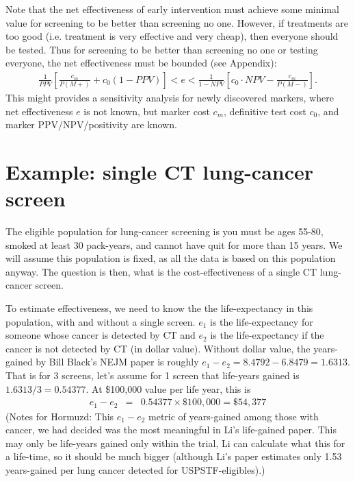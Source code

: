 \documentclass[11pt]{article}
\begin{document}
Note that the net effectiveness of early intervention must achieve some minimal value for screening to be better than screening no one.  However, if treatments are too good (i.e. treatment is very effective and very cheap), then everyone should be tested. Thus for screening to be better than screening no one or testing everyone, the net effectiveness must be bounded (see Appendix):
\begin{eqnarray*}
  \frac{1}{PPV}\left[\frac{c_m}{P(M+)}+c_0(1-PPV)\right] < e < \frac{1}{1-NPV}\left[c_0\cdot NPV - \frac{c_m}{P(M-)}\right]. 
\end{eqnarray*}
This might provides a sensitivity analysis for newly discovered markers, where net effectiveness $e$ is not known, but marker cost $c_m$, definitive test cost $c_0$, and marker PPV/NPV/positivity are known.  


\section{Example: single CT lung-cancer screen}

The eligible population for lung-cancer screening is you must be ages 55-80, smoked at least 30 pack-years, and cannot have quit for more than 15 years.  We will assume this population is fixed, as all the data is based on this population anyway.  The question is then, what is the cost-effectiveness of a single CT lung-cancer screen.

To estimate effectiveness, we need to know the the life-expectancy in this population, with and without a single screen.  $e_1$ is the life-expectancy for someone whose cancer is detected by CT and $e_2$ is the life-expectancy if the cancer is not detected by CT (in dollar value). Without dollar value, the years-gained by Bill Black's NEJM paper is roughly $e_1-e_2=8.4792-6.8479=1.6313$.  That is for 3 screens, let's assume for 1 screen that life-years gained is $1.6313/3=0.54377$.  At \$100,000 value per life year, this is
\begin{eqnarray*}
e_1-e_2 &=& 0.54377\times\$100,000 = \$54,377
\end{eqnarray*}
(Notes for Hormuzd: This $e_1-e_2$ metric of years-gained among those with cancer, we had decided was the most meaningful in Li's life-gained paper.  This may only be life-years gained only within the trial, Li can calculate what this for a life-time, so it should be much bigger (although Li's paper estimates only 1.53 years-gained per lung cancer detected for USPSTF-eligibles).) 
\end{document}
